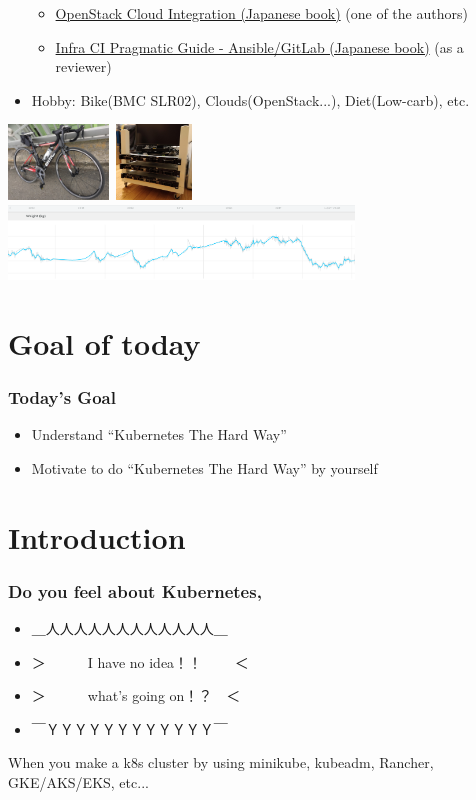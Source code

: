 \documentclass[aspectratio=169,11pt,hyperref={colorlinks=true}]{beamer}
\begin{document}
\begin{frame}
\begin{itemize}
      \begin{itemize}
      \item \href{https://www.amazon.co.jp/dp/4798139785/}{\scriptsize{OpenStack
        Cloud Integration (Japanese book)}} (one of the authors)
      \item \href{https://www.amazon.co.jp/dp/4798155128/}{\scriptsize{Infra CI
        Pragmatic Guide - Ansible/GitLab (Japanese book)}} (as a reviewer)
      \end{itemize}
    \item Hobby: Bike(BMC SLR02), Clouds(OpenStack...), Diet(Low-carb), etc.
  \end{itemize}
  \includegraphics[height=20mm]{images/my-bike.jpg}~\includegraphics[height=20mm]{images/server_front.jpg}~\includegraphics[height=20mm]{images/my-weight.png}
\end{frame}

\section{Goal of today}
\begin{frame}
  \frametitle{Today's Goal}
  \begin{itemize}
    \item Understand ``Kubernetes The Hard Way''
    \item Motivate to do ``Kubernetes The Hard Way'' by yourself
  \end{itemize}
\end{frame}

\section{Introduction}
\begin{frame}
  \frametitle{Do you feel about Kubernetes,}
  \begin{itemize}
    \item[] \Huge{＿人人人人人人人人人人人人＿}
    \item[] \Huge{＞　　　I have no idea！！ 　　＜}
    \item[] \Huge{＞　　　what's going on！？　＜}
    \item[] \Huge{￣ＹＹＹＹＹＹＹＹＹＹＹＹ￣}
  \end{itemize}
  When you make a k8s cluster by using minikube, kubeadm, Rancher, GKE/AKS/EKS, etc...
\end{frame}
\end{document}
